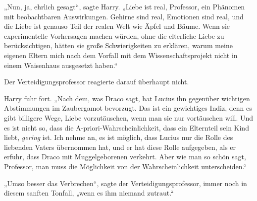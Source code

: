 „Nun, ja, ehrlich gesagt“, sagte Harry.
„Liebe ist real, Professor, ein Phänomen mit beobachtbaren Auswirkungen. Gehirne sind real, Emotionen sind real, und die Liebe ist genauso Teil der realen Welt wie Äpfel und Bäume. Wenn sie experimentelle Vorhersagen machen würden, ohne die elterliche Liebe zu berücksichtigen, hätten sie große Schwierigkeiten zu erklären, warum meine eigenen Eltern mich nach dem Vorfall mit dem Wissenschaftsprojekt nicht in einem Waisenhaus ausgesetzt haben.“

Der Verteidigungsprofessor reagierte darauf überhaupt nicht.

Harry fuhr fort.
„Nach dem, was Draco sagt, hat Lucius ihn gegenüber wichtigen Abstimmungen im Zaubergamot bevorzugt. Das ist ein gewichtiges Indiz, denn es gibt billigere Wege, Liebe vorzutäuschen, wenn man sie nur vortäuschen will. Und es ist nicht so, dass die A-priori-Wahrscheinlichkeit, dass ein Elternteil sein Kind liebt, \emph{gering} ist. Ich nehme an, es ist möglich, dass Lucius nur die Rolle des liebenden Vaters übernommen hat, und er hat diese Rolle aufgegeben, als er erfuhr, dass Draco mit Muggelgeborenen verkehrt. Aber wie man so schön sagt, Professor, man muss die Möglichkeit von der Wahrscheinlichkeit unterscheiden.“

„Umso besser das Verbrechen“, sagte der Verteidigungsprofessor, immer noch in diesem sanften Tonfall, „wenn es ihm niemand zutraut.“

